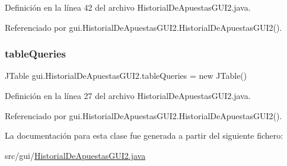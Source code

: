 Definición en la línea 42 del archivo Historial\+De\+Apuestas\+G\+U\+I2.\+java.



Referenciado por gui.\+Historial\+De\+Apuestas\+G\+U\+I2.\+Historial\+De\+Apuestas\+G\+U\+I2().

\mbox{\label{classgui_1_1HistorialDeApuestasGUI2_a56d9a2f72bffe6a90852a91306fd2386}} 
\subsubsection{\texorpdfstring{tableQueries}{tableQueries}}
{\footnotesize\ttfamily J\+Table gui.\+Historial\+De\+Apuestas\+G\+U\+I2.\+table\+Queries = new J\+Table()\hspace{0.3cm}{\ttfamily [private]}}



Definición en la línea 27 del archivo Historial\+De\+Apuestas\+G\+U\+I2.\+java.



Referenciado por gui.\+Historial\+De\+Apuestas\+G\+U\+I2.\+Historial\+De\+Apuestas\+G\+U\+I2().



La documentación para esta clase fue generada a partir del siguiente fichero\+:\begin{DoxyCompactItemize}
\item 
src/gui/\mbox{\hyperlink{HistorialDeApuestasGUI2_8java}{Historial\+De\+Apuestas\+G\+U\+I2.\+java}}\end{DoxyCompactItemize}

